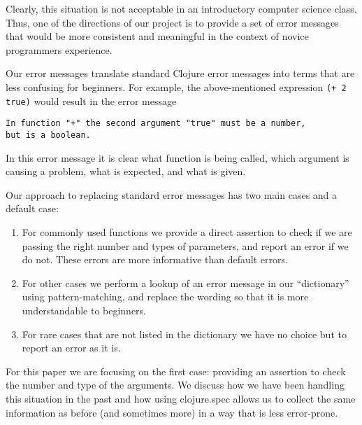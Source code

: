 \documentclass[12pt]{article}
\begin{document}
Clearly, this situation is not acceptable in an introductory computer science class. Thus, one of the directions of our project is to 
provide a set of error messages that would be more consistent and meaningful in the context of 
novice programmers experience. 

Our error messages translate standard Clojure error messages into terms that are less confusing for beginners. 
For example, the above-mentioned expression  {\tt (+ 2 true)} would result in the error message
\begin{verbatim}
In function "+" the second argument "true" must be a number, 
but is a boolean. 
\end{verbatim} 
In this error message it is clear what function is being called, which argument is causing a problem, 
what is expected, and what is given. 

Our approach to replacing standard error messages has two main cases and a default case:
\begin{enumerate}
\item For commonly used functions we provide a direct assertion to check if we are passing the right number and types 
of parameters, and report an error if we do not. These errors are more informative than default errors.
\item For other cases we perform a lookup of an error message in our ``dictionary'' using pattern-matching, 
and replace the wording so that it is more understandable to beginners. 
\item For rare cases that are not listed in the dictionary we have no choice but to report an error as it is. 
\end{enumerate}
For this paper we are focusing on the first case: providing an assertion to check the number and type of the
arguments. We discuss how we have been handling this situation in the past and how using clojure.spec 
allows us to collect the same information as before (and sometimes more) in a way that is less error-prone. 
\end{document}
